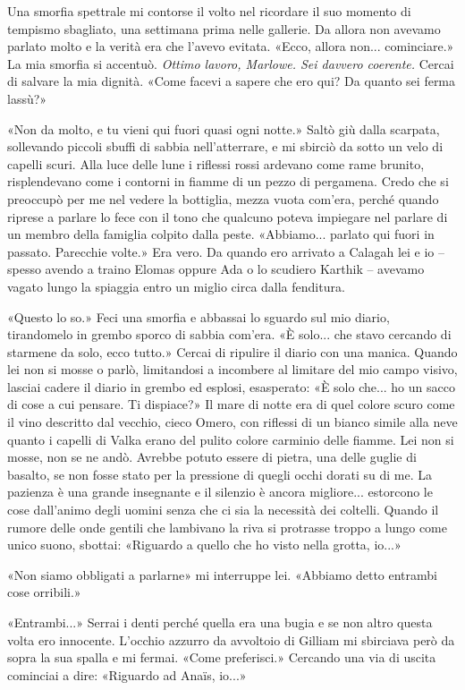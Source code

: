 Una smorfia spettrale mi contorse il volto nel ricordare il suo momento
di tempismo sbagliato, una settimana prima nelle gallerie. Da allora non
avevamo parlato molto e la verità era che l'avevo evitata. «Ecco, allora
non... cominciare.» La mia smorfia si accentuò. \emph{Ottimo lavoro,
	Marlowe. Sei davvero coerente.} Cercai di salvare la mia dignità. «Come
facevi a sapere che ero qui? Da quanto sei ferma lassù?»

«Non da molto, e tu vieni qui fuori quasi ogni notte.» Saltò giù dalla
scarpata, sollevando piccoli sbuffi di sabbia nell'atterrare, e mi
sbirciò da sotto un velo di capelli scuri. Alla luce delle lune i
riflessi rossi ardevano come rame brunito, risplendevano come i contorni
in fiamme di un pezzo di pergamena. Credo che si preoccupò per me nel
vedere la bottiglia, mezza vuota com'era, perché quando riprese a
parlare lo fece con il tono che qualcuno poteva impiegare nel parlare di
un membro della famiglia colpito dalla peste. «Abbiamo... parlato qui
fuori in passato. Parecchie volte.» Era vero. Da quando ero arrivato a
Calagah lei e io -- spesso avendo a traino Elomas oppure Ada o lo
scudiero Karthik -- avevamo vagato lungo la spiaggia entro un miglio
circa dalla fenditura.

«Questo lo so.» Feci una smorfia e abbassai lo sguardo sul mio diario,
tirandomelo in grembo sporco di sabbia com'era. «È solo... che stavo
cercando di starmene da solo, ecco tutto.» Cercai di ripulire il diario
con una manica. Quando lei non si mosse o parlò, limitandosi a incombere
al limitare del mio campo visivo, lasciai cadere il diario in grembo ed
esplosi, esasperato: «È solo che... ho un sacco di cose a cui pensare.
Ti dispiace?» Il mare di notte era di quel colore scuro come il vino
descritto dal vecchio, cieco Omero, con riflessi di un bianco simile
alla neve quanto i capelli di Valka erano del pulito colore carminio
delle fiamme. Lei non si mosse, non se ne andò. Avrebbe potuto essere di
pietra, una delle guglie di basalto, se non fosse stato per la pressione
di quegli occhi dorati su di me. La pazienza è una grande insegnante e
il silenzio è ancora migliore... estorcono le cose dall'animo degli
uomini senza che ci sia la necessità dei coltelli. Quando il rumore
delle onde gentili che lambivano la riva si protrasse troppo a lungo
come unico suono, sbottai: «Riguardo a quello che ho visto nella grotta,
io...»

«Non siamo obbligati a parlarne» mi interruppe lei. «Abbiamo detto
entrambi cose orribili.»

«Entrambi...» Serrai i denti perché quella era una bugia e se non altro
questa volta ero innocente. L'occhio azzurro da avvoltoio di Gilliam mi
sbirciava però da sopra la sua spalla e mi fermai. «Come preferisci.»
Cercando una via di uscita cominciai a dire: «Riguardo ad Anaïs, io...»

